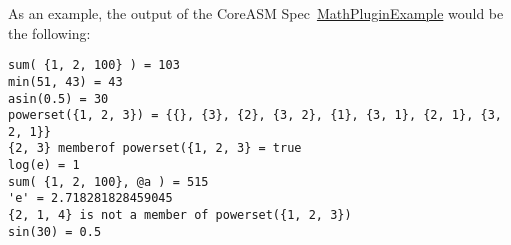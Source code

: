 \documentclass{article}
\newcommand{\CoreASM}{{\sffamily CoreASM}\xspace}
\begin{document}
As an example, the output of the \CoreASM Spec~\hyperref[spec:mathexample]{MathPluginExample} would be the following:

\newenvironment{shell}
	{\noindent \color{shellgray}\vspace{0.2cm} \begin{minipage}{0.9\textwidth} \vspace{0.2cm}}
	{\vspace{0.2cm} \end{minipage} \vspace{0.2cm} \color{black}}

\begin{shell}
\begin{verbatim}
sum( {1, 2, 100} ) = 103
min(51, 43) = 43
asin(0.5) = 30
powerset({1, 2, 3}) = {{}, {3}, {2}, {3, 2}, {1}, {3, 1}, {2, 1}, {3, 2, 1}}
{2, 3} memberof powerset({1, 2, 3} = true
log(e) = 1
sum( {1, 2, 100}, @a ) = 515
'e' = 2.718281828459045
{2, 1, 4} is not a member of powerset({1, 2, 3})
sin(30) = 0.5
\end{verbatim}
\end{shell}

\printindex
\end{document}
